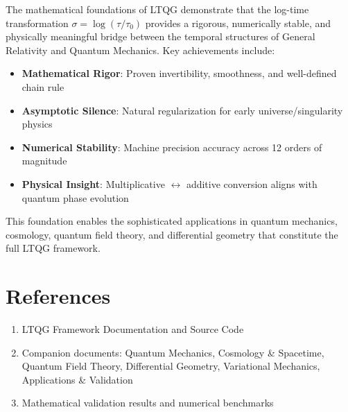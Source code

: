 \documentclass[11pt,a4paper]{article}
\begin{document}
The mathematical foundations of LTQG demonstrate that the log-time transformation $\sigma = \log(\tau/\tau_0)$ provides a rigorous, numerically stable, and physically meaningful bridge between the temporal structures of General Relativity and Quantum Mechanics. Key achievements include:

\begin{itemize}
\item \textbf{Mathematical Rigor}: Proven invertibility, smoothness, and well-defined chain rule
\item \textbf{Asymptotic Silence}: Natural regularization for early universe/singularity physics
\item \textbf{Numerical Stability}: Machine precision accuracy across 12 orders of magnitude
\item \textbf{Physical Insight}: Multiplicative $\leftrightarrow$ additive conversion aligns with quantum phase evolution
\end{itemize}

This foundation enables the sophisticated applications in quantum mechanics, cosmology, quantum field theory, and differential geometry that constitute the full LTQG framework.

\section*{References}

\begin{enumerate}
\item LTQG Framework Documentation and Source Code
\item Companion documents: Quantum Mechanics, Cosmology \& Spacetime, Quantum Field Theory, Differential Geometry, Variational Mechanics, Applications \& Validation
\item Mathematical validation results and numerical benchmarks
\end{enumerate}
\end{document}
